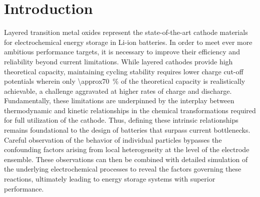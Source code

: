 \documentclass{article}
\begin{document}
\glsresetall{}

\section{Introduction}

Layered transition metal oxides represent the state-of-the-art cathode
materials for electrochemical energy storage in Li-ion batteries. In
order to meet ever more ambitious performance targets, it is necessary
to improve their efficiency and reliability beyond current
limitations. While layered cathodes provide high theoretical capacity,
maintaining cycling stability requires lower charge cut-off potentials
wherein only \SI{\approx70}{\percent} of the theoretical capacity is
realistically achievable, a challenge aggravated at higher rates of
charge and discharge\cite{janek2019-2,chen2020-4}. Fundamentally,
these limitations are underpinned by the interplay between
thermodynamic and kinetic relationships in the chemical
transformations required for full utilization of the cathode. Thus,
defining these intrinsic relationships remains foundational to the
design of batteries that surpass current bottlenecks. Careful
observation of the behavior of individual particles bypasses the
confounding factors arising from local heterogeneity at the level of
the electrode ensemble. These observations can then be combined with
detailed simulation of the underlying electrochemical processes to
reveal the factors governing these reactions, ultimately leading to
energy storage systems with superior performance.

\end{document}
